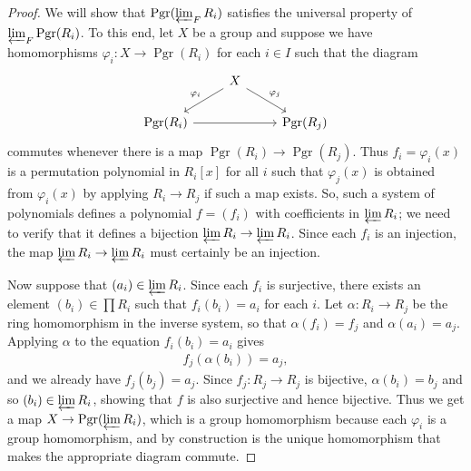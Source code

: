 \documentclass[oneside]{amsart}
\theoremstyle{nthm}
\theoremstyle{ndef}
\theoremstyle{nrem}
\DeclareMathOperator{\Pgr}{Pgr}
\begin{document}
\begin{proof}
   We will show that $\Pgr(\varprojlim_F R_i)$ satisfies the universal property of $\varprojlim_F \Pgr(R_i)$. To this end, let $X$ be a group and suppose we have homomorphisms $\varphi_i:X\to \Pgr(R_i)$ for each $i\in I$ such that the diagram
   \begin{equation*}
   \begin{tikzcd}
       ~ & X\ar[ld,"\varphi_i"']\ar[rd,"\varphi_j"] & ~\\
       \Pgr(R_i)\ar[rr] & ~ & \Pgr(R_j)
   \end{tikzcd}
   \end{equation*}
   commutes whenever there is a map $\Pgr(R_i)\to\Pgr(R_j)$. Thus $f_i = \varphi_i(x)$ is a permutation polynomial in $R_i[x]$ for all $i$ such that $\varphi_j(x)$ is obtained from $\varphi_i(x)$ by applying $R_i\to R_j$ if such a map exists. So, such a system of polynomials defines a polynomial $f = (f_i)$ with coefficients in $\varprojlim R_i$; we need to verify that it defines a bijection $\varprojlim R_i\to\varprojlim R_i$. Since each $f_i$ is an injection, the map $\varprojlim R_i\to\varprojlim R_i$ must certainly be an injection.

   Now suppose that $(a_i)\in \varprojlim R_i$. Since each $f_i$ is surjective, there exists an element $(b_i)\in \prod R_i$ such that $f_i(b_i) = a_i$ for each $i$. Let $\alpha:R_i\to R_j$ be the ring homomorphism in the inverse system, so that $\alpha(f_i) = f_j$ and $\alpha(a_i) = a_j$. Applying $\alpha$ to the equation $f_i(b_i) = a_i$ gives
   \begin{align*}
       f_j(\alpha(b_i)) = a_j,
   \end{align*}
and we already have $f_j(b_j) = a_j$. Since $f_j:R_j\to R_j$ is bijective, $\alpha(b_i) = b_j$ and so $(b_i)\in\varprojlim R_i$, showing that $f$ is also surjective and hence bijective. Thus we get a map $X\to \Pgr(\varprojlim R_i)$, which is a group homomorphism because each $\varphi_i$ is a group homomorphism, and by construction is the unique homomorphism that makes the appropriate diagram commute.
\end{proof}
\end{document}
